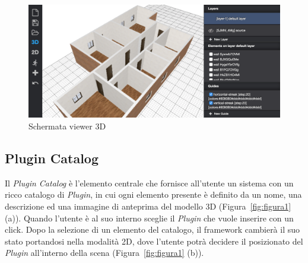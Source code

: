 \begin{figure}[htbp] %
   \centering
   \includegraphics[width=1\linewidth]{images/3d}
   \caption{Schermata viewer 3D }
   \label{fig:viewer3D}
\end{figure}
\newpage

\subsection{Plugin Catalog}
\label{sec:chapter_2_section_2_sub_3}

\noindent
 Il \emph{Plugin Catalog} \`e l'elemento centrale che fornisce all'utente un sistema con un ricco catalogo di \emph{Plugin},
 in cui ogni elemento presente \`e definito da un nome, una descrizione ed una
 immagine di anteprima del modello 3D (Figura~\ref{fig:figura1} (a)). Quando l'utente \`e al suo interno
 sceglie il \emph{Plugin} che vuole inserire con un click.
 Dopo la selezione di un elemento del catalogo, il framework cambierà il suo stato portandosi nella modalit\`a 2D,
 dove l'utente potrà decidere il posizionato del \emph{Plugin} all'interno della scena (Figura~\ref{fig:figura1} (b)).

